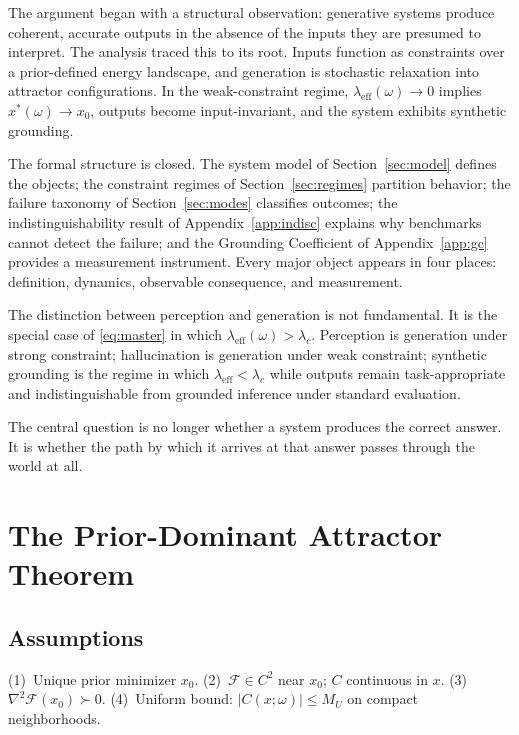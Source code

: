 \documentclass[twocolumn,10pt]{article}
\theoremstyle{thmstyle}
\theoremstyle{defstyle}
\newcommand{\Fprior}{\mathcal{F}}
\newcommand{\leff}{\lambda_{\mathrm{eff}}}
\begin{document}
The argument began with a structural observation: generative systems
produce coherent, accurate outputs in the absence of the inputs they are
presumed to interpret. The analysis traced this to its root. Inputs
function as constraints over a prior-defined energy landscape, and
generation is stochastic relaxation into attractor configurations. In
the weak-constraint regime, $\leff(\omega)\to 0$ implies
$x^*(\omega)\to x_0$, outputs become input-invariant, and the system
exhibits synthetic grounding.

The formal structure is closed. The system model of
Section~\ref{sec:model} defines the objects; the constraint regimes of
Section~\ref{sec:regimes} partition behavior; the failure taxonomy of
Section~\ref{sec:modes} classifies outcomes; the indistinguishability
result of Appendix~\ref{app:indisc} explains why benchmarks cannot detect
the failure; and the Grounding Coefficient of Appendix~\ref{app:gc}
provides a measurement instrument. Every major object appears in four
places: definition, dynamics, observable consequence, and measurement.

The distinction between perception and generation is not fundamental. It
is the special case of \eqref{eq:master} in which $\leff(\omega)>\lambda_c$.
Perception is generation under strong constraint; hallucination is
generation under weak constraint; synthetic grounding is the regime in
which $\leff<\lambda_c$ while outputs remain task-appropriate and
indistinguishable from grounded inference under standard evaluation.

The central question is no longer whether a system produces the correct
answer. It is whether the path by which it arrives at that answer passes
through the world at all.

\appendix

\section{The Prior-Dominant Attractor Theorem}
\label{app:pdat}

\subsection{Assumptions}
(1)~Unique prior minimizer $x_0$. (2)~$\Fprior\in C^2$ near $x_0$;
$C$ continuous in $x$. (3)~$\nabla^2\Fprior(x_0)\succ 0$. (4)~Uniform
bound: $|C(x;\omega)|\leq M_U$ on compact neighborhoods.
\end{document}
